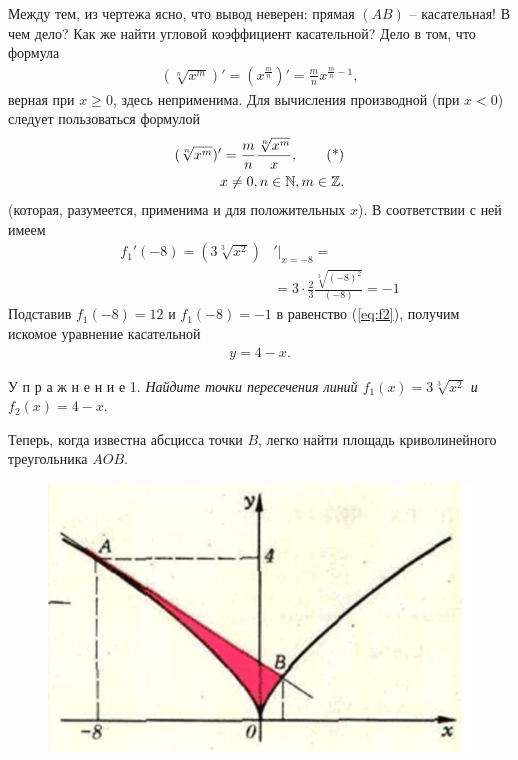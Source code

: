 Между тем, из чертежа ясно, что вывод неверен: прямая $(AB)$ -- касательная! В чем дело? Как же найти угловой коэффициент касательной? Дело в том, что формула 
\vspace{-5pt}
\begin{align*}
    (\sqrt[n]{x^m})'=(x^{\frac{m}{n}})'=\frac{m}{n}x^{\frac{m}{n}-1},
\end{align*}
верная при $x \geq 0$, здесь неприменима. Для вычисления производной (при $x<0$) следует пользоваться формулой
\vspace{-5pt}
\begin{align}
    (\sqrt[n]{x^m})'=\frac{m}{n}\frac{\sqrt[n]{x^m}}{x}, \tag{*} \\
    x \neq 0, n \in \mathbb{N}, m \in \mathbb{Z}. \notag
\end{align}
(которая, разумеется, применима и для положительных $x$). В соответствии с ней имеем
\vspace{-5pt}
\begin{align*}
    f_1'(-8)=(3\sqrt[3]{x^2})&'|_{x=-8}=\\
    &=3\cdot\frac{2}{3}\frac{\sqrt[3]{(-8)^2}}{(-8)}=-1
\end{align*}
Подставив $f_1(-8)=12$ и $f_1(-8)=-1$ в равенство (\ref{eq:f2}), получим искомое уравнение касательной 
\vspace{-5pt}
\begin{align*}
    y=4-x.
\end{align*}

У п р а ж н е н и е 1. \textit{Найдите точки пересечения линий $f_1(x)=3\sqrt[3]{x^2}$ и $f_2(x)=4-x$}.

Теперь, когда известна абсцисса точки $B$, легко найти площадь криволинейного треугольника $AOB$.

\vspace{0.5cm}
\begin{figure}[h]
    \centering
    \includegraphics[width=1\linewidth]{latex21111.png}
    \label{fig:enter-label}
\end{figure}